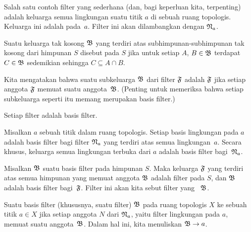 \begin{exam} Salah satu contoh filter yang sederhana (dan, bagi keperluan kita, terpenting) adalah keluarga semua lingkungan suatu titik $a$ di sebuah
ruang topologis.  Keluarga ini adalah
 pada~$a$. Filter ini akan
dilambangkan dengan $\mathfrak{N}_a$.
\end{exam}

\begin{defn} Suatu keluarga tak kosong $\mathfrak{B}$ yang terdiri atas subhimpunan-subhimpunan tak kosong dari himpunan $S$ disebut
 pada $S$ jika untuk setiap $A$, $B \in \mathfrak{B}$ terdapat $C \in \mathfrak{B}$ sedemikian sehingga $C \subseteq A \cap B$.

Kita mengatakan bahwa suatu subkeluarga $\mathfrak{B}$ dari filter $\mathfrak{F}$ adalah
 $\mathfrak{F}$ jika setiap anggota $\mathfrak{F}$ memuat suatu anggota~$\mathfrak{B}$.  (Penting untuk memeriksa bahwa
setiap subkeluarga seperti itu memang merupakan basis filter.)
\end{defn}

\begin{exam} Setiap filter adalah basis filter.
\end{exam}

\begin{exam} Misalkan $a$ sebuah titik dalam ruang topologis.  Setiap basis lingkungan pada $a$ adalah basis filter bagi filter $\mathfrak{N}_a$
yang terdiri atas semua lingkungan~$a$. Secara khusus, keluarga semua lingkungan terbuka dari $a$ adalah basis filter bagi~$\mathfrak{N}_a$.
\end{exam}

\begin{exam} Misalkan $\mathfrak{B}$ suatu basis filter pada himpunan $S$. Maka keluarga $\mathfrak{F}$ yang terdiri atas semua himpunan yang memuat anggota $\mathfrak{B}$
adalah filter pada $S$, dan $\mathfrak{B}$ adalah basis filter bagi~$\mathfrak{F}$.  Filter ini akan kita sebut filter yang
~$\mathfrak{B}$.
\end{exam}

\begin{defn} Suatu basis filter (khususnya, suatu filter) $\mathfrak{B}$ pada ruang topologis $X$
 ke sebuah titik $a \in X$ jika setiap anggota $N$ dari $\mathfrak{N}_a$, yaitu filter lingkungan pada $a$, memuat suatu anggota~$\mathfrak{B}$.
Dalam hal ini, kita
menuliskan $\mathfrak{B} \rightarrow a$.
\end{defn}

